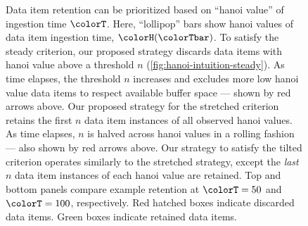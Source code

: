\begin{figure}
{  \footnotesize
  Data item retention can be prioritized based on ``hanoi value'' of ingestion time $\colorT$.
  Here, ``lollipop'' bars show hanoi values of data item ingestion time, $\colorH(\colorTbar)$.
  To satisfy the steady criterion, our proposed strategy discards data items with hanoi value above a threshold $n$ (\ref{fig:hanoi-intuition-steady}).
  As time elapses, the threshold $n$ increases and excludes more low hanoi value data items to respect available buffer space --- shown by red arrows above.
  Our proposed strategy for the stretched criterion retains the first $n$ data item instances of all observed hanoi values.
  As time elapses, $n$ is halved across hanoi values in a rolling fashion --- also shown by red arrows above.
  Our strategy to satisfy the tilted criterion operates similarly to the stretched strategy, except the \textit{last} $n$ data item instances of each hanoi value are retained.
  Top and bottom panels compare example retention at $\colorT=50$ and $\colorT=100$, respectively.
  Red hatched boxes indicate discarded data items.
  Green boxes indicate retained data items.
  }
\label{fig:hanoi-intuition}
\end{figure}
